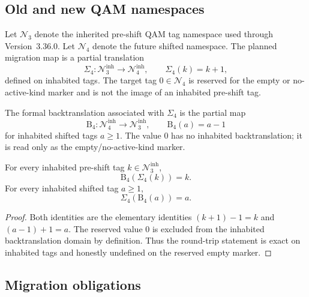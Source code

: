 \subsection{Old and new QAM namespaces}
\label{subsec:v3370-old-new-qam-namespaces}

\begin{definition}
\label{def:v3370-pre-shift-shifted-tag-namespaces}
Let $\mathcal N_{3}$ denote the inherited pre-shift QAM tag namespace used through
Version~3.36.0. Let $\mathcal N_{4}$ denote the future shifted namespace. The
planned migration map is a partial translation
\[
 \Sigma_{4}\colon \mathcal N_{3}^{\mathrm{inh}}\longrightarrow
 \mathcal N_{4}^{\mathrm{inh}},
 \qquad
 \Sigma_{4}(k)=k+1,
\]
defined on inhabited tags. The target tag $0\in\mathcal N_{4}$ is reserved for
the empty or no-active-kind marker and is not the image of an inhabited
pre-shift tag.
\end{definition}

\begin{definition}
\label{def:v3370-backtranslation-map}
The formal backtranslation associated with $\Sigma_{4}$ is the partial map
\[
 \mathrm{B}_{4}\colon \mathcal N_{4}^{\mathrm{inh}}\longrightarrow
 \mathcal N_{3}^{\mathrm{inh}},
 \qquad
 \mathrm{B}_{4}(a)=a-1
\]
for inhabited shifted tags $a\geq 1$. The value $0$ has no inhabited
backtranslation; it is read only as the empty/no-active-kind marker.
\end{definition}

\begin{lemma}
\label{lem:v3370-round-trip-inhabited-tags}
For every inhabited pre-shift tag $k\in\mathcal N_{3}^{\mathrm{inh}}$,
\[
 \mathrm{B}_{4}(\Sigma_{4}(k))=k.
\]
For every inhabited shifted tag $a\geq 1$,
\[
 \Sigma_{4}(\mathrm{B}_{4}(a))=a.
\]
\end{lemma}

\begin{proof}
Both identities are the elementary identities $(k+1)-1=k$ and $(a-1)+1=a$.
The reserved value $0$ is excluded from the inhabited backtranslation domain by
definition. Thus the round-trip statement is exact on inhabited tags and
honestly undefined on the reserved empty marker.
\end{proof}

\subsection{Migration obligations}
\label{subsec:v3370-migration-obligations}

